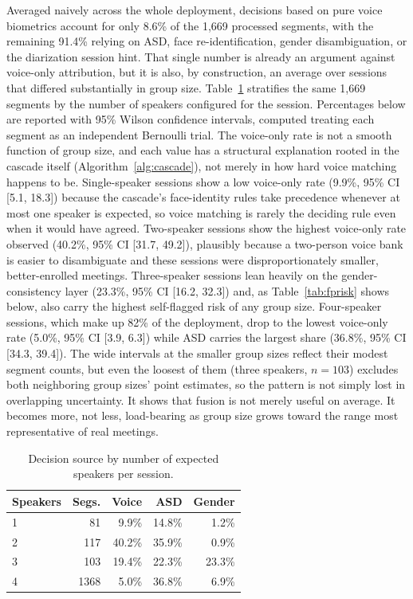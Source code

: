 \documentclass[conference,a4paper]{IEEEtran}
\begin{document}
Averaged naively across the whole deployment, decisions based on pure
voice biometrics account for only 8.6\% of the 1{,}669 processed
segments, with the remaining 91.4\% relying on ASD, face
re-identification, gender disambiguation, or the diarization session
hint. That single number is already an argument against voice-only
attribution, but it is also, by construction, an average over sessions
that differed substantially in group size. Table~\ref{tab:byspeakers}
stratifies the same 1{,}669 segments by the
number of speakers configured for the session. Percentages below are
reported with 95\% Wilson confidence intervals, computed treating each
segment as an independent Bernoulli trial. The voice-only rate is
not a smooth function of group size, and each value has a structural
explanation rooted in the cascade itself (Algorithm~\ref{alg:cascade}),
not merely in how hard voice matching happens to be. Single-speaker
sessions show a low voice-only rate (9.9\%, 95\% CI [5.1, 18.3]) because
the cascade's
face-identity rules take precedence whenever at most one speaker is
expected, so voice matching is rarely the deciding rule even when it
would have agreed. Two-speaker sessions show the highest voice-only
rate observed (40.2\%, 95\% CI [31.7, 49.2]), plausibly because a
two-person voice bank is
easier to disambiguate and these sessions were disproportionately
smaller, better-enrolled meetings. Three-speaker sessions lean heavily
on the gender-consistency layer (23.3\%, 95\% CI [16.2, 32.3]) and, as
Table~\ref{tab:fprisk}
shows below, also carry the highest self-flagged risk of any group
size. Four-speaker sessions, which make up 82\% of the deployment,
drop to the lowest voice-only rate (5.0\%, 95\% CI [3.9, 6.3]) while ASD
carries the
largest share (36.8\%, 95\% CI [34.3, 39.4]). The wide intervals at the
smaller group sizes reflect their modest segment counts, but even the
loosest of them (three speakers, $n=103$) excludes both neighboring
group sizes' point estimates, so the pattern is not simply lost in
overlapping uncertainty. It shows that fusion is not
merely useful on average. It becomes more, not less, load-bearing as
group size grows toward the range most representative of real
meetings.

\begin{table}[h]
\centering
\caption{Decision source by number of expected speakers per session.}
\label{tab:byspeakers}
\footnotesize
\begin{tabular}{lrrrr}
\toprule
\textbf{Speakers} & \textbf{Segs.} & \textbf{Voice} & \textbf{ASD} & \textbf{Gender} \\
\midrule
1 &   81 &  9.9\% & 14.8\% &  1.2\% \\
2 &  117 & 40.2\% & 35.9\% &  0.9\% \\
3 &  103 & 19.4\% & 22.3\% & 23.3\% \\
4 & 1368 &  5.0\% & 36.8\% &  6.9\% \\
\bottomrule
\end{tabular}
\end{table}
\end{document}
